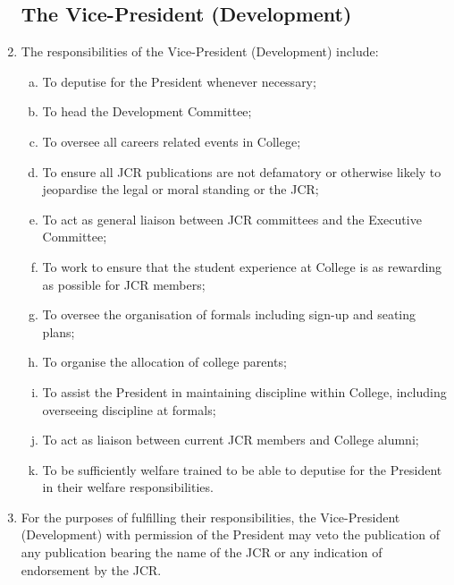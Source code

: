 \documentclass[12pt]{article}  %
\begin{document}
\begin{enumerate}
    \subsection{The Vice-President (Development)}
    \item The responsibilities of the Vice-President (Development) include:
    \begin{enumerate}[(a)]
        \item To deputise for the President whenever necessary;
        \item To head the Development Committee;
        \item To oversee all careers related events in College;
        \item To ensure all JCR publications are not defamatory or otherwise likely to jeopardise the legal or moral standing or the JCR;
        \item To act as general liaison between JCR committees and the Executive Committee;
        \item To work to ensure that the student experience at College is as rewarding as possible for JCR members;
        \item To oversee the organisation of formals including sign-up and seating plans;
        \item To organise the allocation of college parents;
        \item To assist the President in maintaining discipline within College, including overseeing discipline at formals;
        \item To act as liaison between current JCR members and College alumni;
        \item To be sufficiently welfare trained to be able to deputise for the President in their welfare responsibilities.
    \end{enumerate}
    \item For the purposes of fulfilling their responsibilities, the Vice-President (Development) with permission of the President may veto the publication of any publication bearing the name of the JCR or any indication of endorsement by the JCR.

\end{enumerate}
\end{document}
